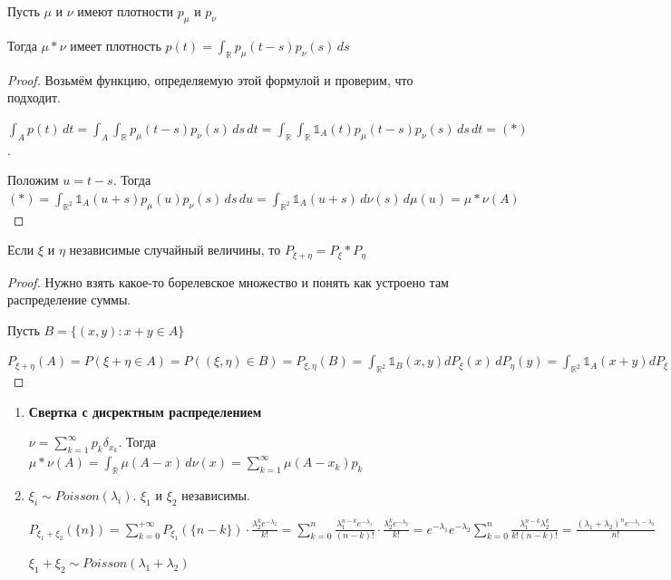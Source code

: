 \begin{theorem}
    Пусть $\mu$ и $\nu$ имеют плотности $p_{\mu}$ и $p_{\nu}$

    Тогда $\mu * \nu$ имеет плотность $p(t) = \int_{\mathbb{R}} p_{\mu} (t - s) p_{\nu} (s) \, ds$
\end{theorem}

\begin{proof}
    Возьмём функцию, определяемую этой формулой и проверим, что подходит.

    $\int_A p(t) \, dt = \int_A \int_{\mathbb{R}} p_{\mu} (t - s) p_{\nu} (s) \, ds \, dt = \int_{\mathbb{R}}
    \int_{\mathbb{R}} \mathds{1}_A (t) p_{\mu} (t - s) p_{\nu} (s) \, ds \, dt = (*)$.

    Положим $u = t - s$. Тогда $(*) = \int_{\mathbb{R}^2} \mathds{1}_{A} (u + s) p_{\mu} (u) p_{\nu} (s) \, ds \, du = 
    \int_{\mathbb{R}^2} \mathds{1}_A (u + s) \, d\nu (s) \, d \mu (u) = \mu * \nu (A)$
\end{proof}

\begin{theorem}
    Если $\xi$ и $\eta$ независимые случайный величины, то $P_{\xi + \eta} = P_{\xi} * P_{\eta}$
\end{theorem}

\begin{proof}
    Нужно взять какое-то борелевское множество и понять как устроено там распределение суммы.

    Пусть $B = \{ (x, y) : x + y \in A \}$

    $P_{\xi + \eta} (A) = P(\xi + \eta \in A) = P((\xi, \eta) \in B) = P_{\xi, \eta} (B) = 
    \int_{\mathbb{R}^2} \mathds{1}_B (x, y) d P_{\xi} (x) \, dP_{\eta} (y) =
    \int_{\mathbb{R}^2} \mathds{1}_A (x + y) d P_{\xi} (x) \, dP_{\eta} (y) = P_{\xi} * P_{\eta} (A)$
\end{proof}

\begin{example}
    \begin{enumerate}
        \item {
            \textbf{Свертка с дисректным распределением}

            $\nu = \sum_{k = 1}^{\infty} p_k \delta_{x_k}$. Тогда $\mu * \nu (A) = \int_{\mathbb{R}} \mu (A - x) \, d\nu (x) = 
            \sum_{k = 1}^{\infty} \mu (A - x_k) p_k$
        }
        \item {
            $\xi_i \sim Poisson(\lambda_i)$. $\xi_1$ и $\xi_2$ независимы.

            $P_{\xi_1 + \xi_2} (\{ n \}) = \sum_{k = 0}^{+\infty} P_{\xi_1} (\{ n  - k \}) \cdot 
            \frac{\lambda_2^k e^{-\lambda_2}}{k!} = \sum_{k = 0}^{n} \frac{\lambda_1^{n - k} e^{-\lambda_1}}{(n - k)!} \cdot 
            \frac{\lambda_2^k e^{-\lambda_2}}{k!} = e^{-\lambda_1} e^{-\lambda_2} \sum_{k = 0}^n \frac{\lambda_1^{n - k} \lambda_2^k}{k! (n - k)!} =
            \frac{(\lambda_1 + \lambda_2)^n e^{-\lambda_1 - \lambda_2}}{n!}$

            $\xi_1 + \xi_2 \sim Poisson(\lambda_1 + \lambda_2)$
        }
    \end{enumerate}
\end{example}



